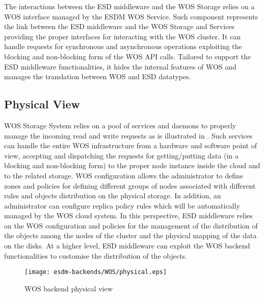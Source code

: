 The interactions between the ESD middleware and the WOS Storage relies on a WOS interface managed by the ESDM WOS Service. Such component represents the link between the ESD middleware and the WOS Storage and Services providing the proper interfaces for interacting with the WOS cluster. It can handle requests for synchronous and asynchronous operations exploiting the blocking and non-blocking form of the WOS API calls. Tailored to support the ESD middleware functionalities, it hides the internal features of WOS and manages the translation between WOS and ESD datatypes.  


\subsection{Physical View}

WOS Storage System relies on a pool of services and daemons to properly manage the incoming read and write requests as is illustrated in .
Such services can handle the entire WOS infrastructure from a hardware and software point of view, accepting and dispatching the requests for getting/putting data (in a blocking and non-blocking form) to the proper node instance inside the cloud and to the related storage. 
WOS configuration allows the administrator to define zones and policies for defining different groups of nodes associated with different rules and objects distribution on the physical storage.
In addition, an administrator can configure replica policy rules which will be automatically managed by the WOS cloud system. 
In this perspective, ESD middleware relies on the WOS configuration and policies for the management of the distribution of the objects among the nodes of the cluster and the physical mapping of the data on the disks. 
At a higher level, ESD middleware can exploit the WOS backend functionalities to customise the distribution of the objects.


\begin{figure}
	\centering
	\texttt{[image: esdm-backends/WOS/physical.eps]}
	\caption{WOS backend physical view}
	\label{fig:WOS backend physical view}
\end{figure}



